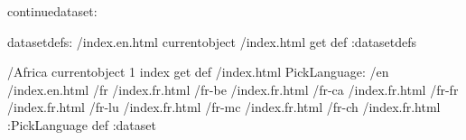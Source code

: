 \begin{ingrid}
continuedataset:

datasetdefs:
/index.en.html currentobject /index.html get def
:datasetdefs

/Africa currentobject 1 index get def
/index.html {
PickLanguage:
/en /index.en.html
/fr /index.fr.html
/fr-be /index.fr.html
/fr-ca /index.fr.html
/fr-fr /index.fr.html
/fr-lu /index.fr.html
/fr-mc /index.fr.html
/fr-ch /index.fr.html
:PickLanguage
} def
:dataset
\end{ingrid}
